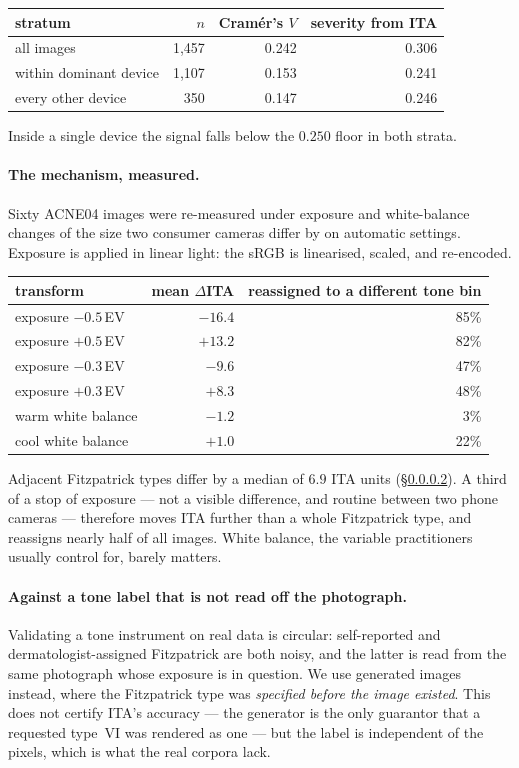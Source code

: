 \documentclass[11pt]{article}
\begin{document}
\begin{center}
\begin{tabular}{lrrr}
\toprule
stratum & $n$ & Cram\'er's $V$ & severity from ITA \\
\midrule
all images & 1{,}457 & 0.242 & 0.306 \\
within dominant device & 1{,}107 & 0.153 & 0.241 \\
every other device & 350 & 0.147 & 0.246 \\
\bottomrule
\end{tabular}
\end{center}

\noindent Inside a single device the signal falls below the $0.250$ floor in both strata.

\paragraph{The mechanism, measured.} Sixty ACNE04 images were re-measured under exposure and
white-balance changes of the size two consumer cameras differ by on automatic settings.
Exposure is applied in linear light: the sRGB is linearised, scaled, and re-encoded.

\begin{center}
\begin{tabular}{lrr}
\toprule
transform & mean $\Delta$ITA & reassigned to a different tone bin \\
\midrule
exposure $-0.5$\,EV & $-16.4$ & 85\% \\
exposure $+0.5$\,EV & $+13.2$ & 82\% \\
exposure $-0.3$\,EV & $-9.6$ & 47\% \\
exposure $+0.3$\,EV & $+8.3$ & 48\% \\
warm white balance & $-1.2$ & 3\% \\
cool white balance & $+1.0$ & 22\% \\
\bottomrule
\end{tabular}
\end{center}

\noindent Adjacent Fitzpatrick types differ by a median of $6.9$ ITA units
(\S\ref{sec:ita-gt}). A third of a stop of exposure --- not a visible difference, and
routine between two phone cameras --- therefore moves ITA further than a whole Fitzpatrick
type, and reassigns nearly half of all images. White balance, the variable practitioners
usually control for, barely matters.

\paragraph{Against a tone label that is not read off the photograph.}
\label{sec:ita-gt}
Validating a tone instrument on real data is circular: self-reported and
dermatologist-assigned Fitzpatrick are both noisy, and the latter is read from the same
photograph whose exposure is in question. We use generated images instead, where the
Fitzpatrick type was \emph{specified before the image existed}. This does not certify ITA's
accuracy --- the generator is the only guarantor that a requested type~VI was rendered as
one --- but the label is independent of the pixels, which is what the real corpora lack.
\end{document}
